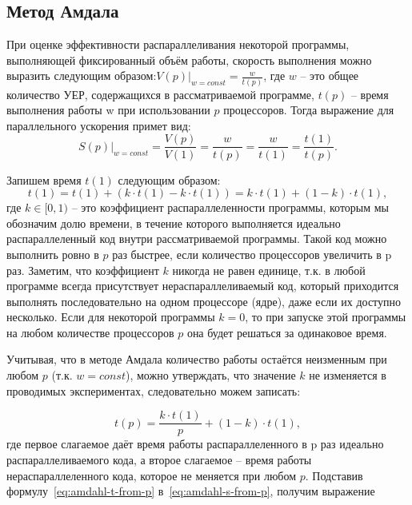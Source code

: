 \subsection{Метод Амдала}
\label{subsec:amdahl-law}

При оценке эффективности распараллеливания некоторой программы, выполняющей фиксированный объём работы, скорость выполнения можно выразить следующим образом:$\left.V(p)\right|_{w = const} = \frac{w}{t(p)}$, где $w$ – это общее количество УЕР, содержащихся в рассматриваемой программе, $t(p)$ – время выполнения работы w при использовании $p$ процессоров. Тогда выражение для параллельного ускорения примет вид:
\begin{equation}
    \label{eq:amdahl-s-from-p}
    \left.S(p)\right|_{w = const} = \frac{V(p)}{V(1)} = \frac{w}{t(p)} = \frac{w}{t(1)} = \frac{t(1)}{t(p)}.
\end{equation}

Запишем время $t(1)$ следующим образом:
\begin{equation}
    \label{eq:amdahl-s-from-p-2}
    t(1) = t(1) + (k \cdot t(1) - k \cdot t(1)) = k \cdot t(1) + (1 - k) \cdot t(1),
\end{equation}
где $k \in [0,1)$ -- это коэффициент распараллеленности программы, которым мы обозначим долю времени, в течение которого выполняется идеально распараллеленный код внутри рассматриваемой программы. Такой код можно выполнить ровно в $p$ раз быстрее, если количество процессоров увеличить в p раз. Заметим, что коэффициент $k$ никогда не равен единице, т.к. в любой программе всегда присутствует нераспараллеливаемый код, который приходится выполнять последовательно на одном процессоре (ядре), даже если их доступно несколько. Если для некоторой программы $k=0$, то при запуске этой программы на любом количестве процессоров $p$ она будет решаться за одинаковое время.

Учитывая, что в методе Амдала количество работы остаётся неизменным при любом $p$ (т.к. $w=const$), можно утверждать, что значение $k$ не изменяется в проводимых экспериментах, следовательно можем записать:

\begin{equation}
    \label{eq:amdahl-t-from-p}
    t(p) = \frac{k \cdot t(1)}{p} + (1 - k) \cdot t(1),
\end{equation}
где первое слагаемое даёт время работы распараллеленного в p раз идеально распараллеливаемого кода, а второе слагаемое – время работы нераспараллеленного кода, которое не меняется при любом $p$. Подставив формулу~\eqref{eq:amdahl-t-from-p} в~\eqref{eq:amdahl-s-from-p}, получим выражение

